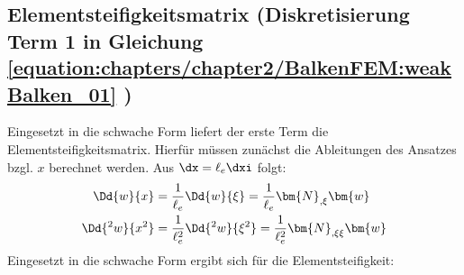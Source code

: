 \documentclass[letterpaper,10pt,german]{jupyterBook}
\begin{document}
\subsection{Elementsteifigkeitsmatrix (Diskretisierung Term 1 in Gleichung \eqref{equation:chapters/chapter2/BalkenFEM:weakBalken_01} )}
\label{\detokenize{chapters/chapter2/BalkenFEM:elementsteifigkeitsmatrix-diskretisierung-term-1-in-gleichung-weakbalken-01}}
\sphinxAtStartPar
Eingesetzt in die schwache Form liefert der erste Term die Elementsteifigkeitsmatrix. Hierfür müssen zunächst die Ableitungen des Ansatzes bzgl. \(x\) berechnet werden. Aus
\(\dx = \ell_e \dxi\) folgt:
\begin{equation}\label{equation:chapters/chapter2/BalkenFEM:Differentialquotient}
\begin{split}\begin{align}
  \Dd{w}{x} & = \frac{1}{\ell_e} \Dd{w}{\xi} = \frac{1}{\ell_e} \bm{N}_{,\xi} \bm{w} \\
  \Dd{^2 w}{x^2} & = \frac{1}{\ell_e^2} \Dd{^2 w}{\xi^2} = \frac{1}{\ell_e^2} \bm{N}_{,\xi\xi} \bm{w}
\end{align}\end{split}
\end{equation}
\sphinxAtStartPar
Eingesetzt in die schwache Form ergibt sich für die Elementsteifigkeit:
\end{document}
